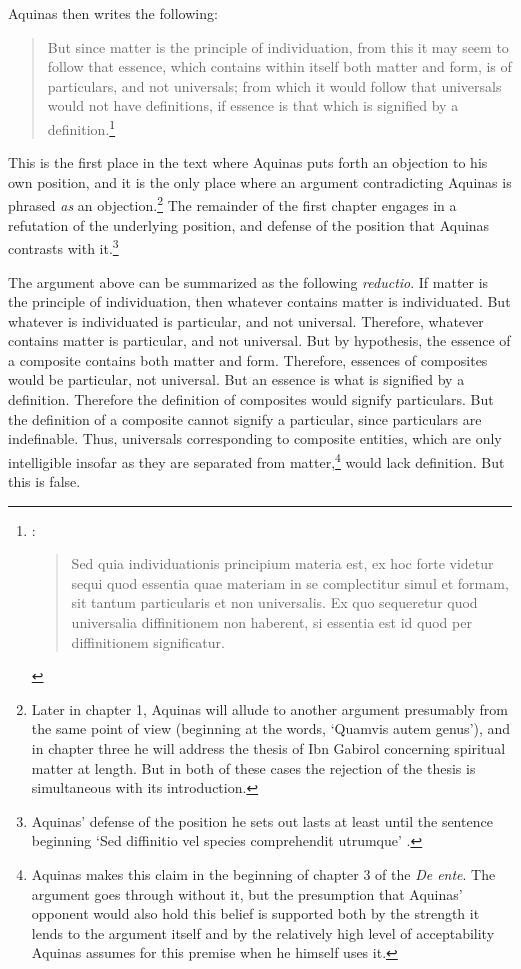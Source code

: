 \documentclass[]{article}
\begin{document}
Aquinas then writes the following:
\begin{quote}
But since matter is the principle of individuation, from this it may seem to follow that essence, which contains within itself both matter and form, is of particulars, and not universals; from which it would follow that universals would not have definitions, if essence is that which is signified by a definition.\footnote{\autocite[ch. 1]{AquinasDEE}:
	\begin{quote}
	Sed quia individuationis principium materia est, ex hoc forte videtur sequi quod essentia quae materiam in se complectitur simul et formam, sit tantum particularis et non universalis. Ex quo sequeretur quod universalia diffinitionem non haberent, si essentia est id quod per diffinitionem significatur.
	\end{quote}} 
\end{quote}
This is the first place in the text where Aquinas puts forth an objection to his own position, and it is the only place where an argument contradicting Aquinas is phrased \textit{as} an objection.\footnote{Later in chapter 1, Aquinas will allude to another argument presumably from the same point of view (beginning at the words, `Quamvis autem genus'), and in chapter three he will address the thesis of Ibn Gabirol concerning spiritual matter at length. But in both of these cases the rejection of the thesis is simultaneous with its introduction.} The remainder of the first chapter engages in a refutation of the underlying position, and defense of the position that Aquinas contrasts with it.\footnote{Aquinas' defense of the position he sets out lasts at least until the sentence beginning `Sed diffinitio vel species comprehendit utrumque' \autocite[ch. 1]{AquinasDEE}.}

The argument above can be summarized as the following \textit{reductio}. If matter is the principle of individuation, then whatever contains matter is individuated. But whatever is individuated is particular, and not universal. Therefore, whatever contains matter is particular, and not universal. But by hypothesis, the essence of a composite contains both matter and form. Therefore, essences of composites would be particular, not universal. But an essence is what is signified by a definition. Therefore the definition of composites would signify particulars. But the definition of a composite cannot signify a particular, since particulars are indefinable. Thus, universals corresponding to composite entities, which are only intelligible insofar as they are separated from matter,\footnote{Aquinas makes this claim in the beginning of chapter 3 of the \textit{De ente}. The argument goes through without it, but the presumption that Aquinas' opponent would also hold this belief is supported both by the strength it lends to the argument itself and by the relatively high level of acceptability Aquinas assumes for this premise when he himself uses it.}  would lack definition. But this is false.  
\end{document}
